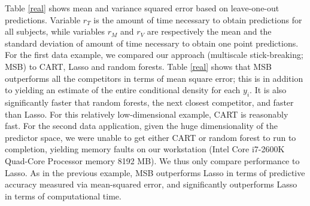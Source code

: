 \documentclass{article} %
\begin{document}
Table \ref{real} shows mean and variance squared error based on leave-one-out predictions. Variable $r_{T}$ is the amount of time necessary to obtain predictions for all subjects, while variables $r_M$ and $r_V$ are respectively the mean and the standard deviation of amount of time necessary to obtain one point predictions. For the first data example, we compared our approach (multiscale stick-breaking; MSB) to CART, Lasso and random forests. 
Table \ref{real} shows that MSB outperforms all the competitors in terms of mean square error; this is in addition to yielding an estimate of the entire conditional density for each $y_i$.  It is also significantly faster that random forests, the next closest competitor, and faster than Lasso.  For this relatively low-dimensional example, CART is reasonably fast.   For the second data application, given the huge dimensionality of the predictor space, we were unable to get either CART or random forest to run to completion, yielding memory faults on our workstation (Intel Core i7-2600K Quad-Core Processor memory 8192 MB).  We thus only compare performance to Lasso.  As in the previous example, MSB outperforms Lasso in terms of predictive accuracy measured via mean-squared error, and significantly outperforms Lasso in terms of computational time.  
\end{document}

